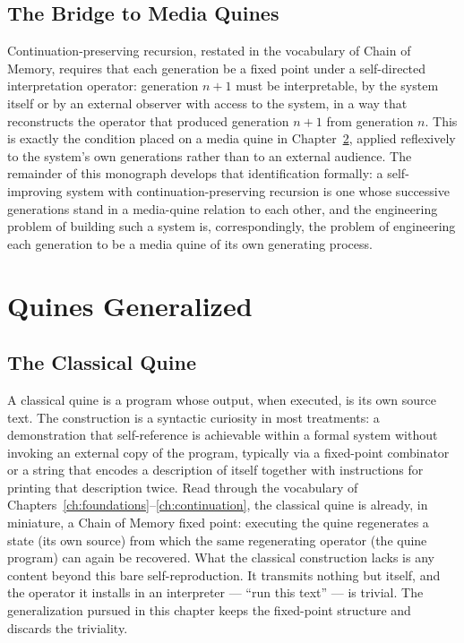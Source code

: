 \documentclass[11pt]{book}
\begin{document}
\section{The Bridge to Media Quines}

Continuation-preserving recursion, restated in the vocabulary of Chain of Memory, requires that each generation be a fixed point under a self-directed interpretation operator: generation $n+1$ must be interpretable, by the system itself or by an external observer with access to the system, in a way that reconstructs the operator that produced generation $n+1$ from generation $n$. This is exactly the condition placed on a media quine in Chapter~\ref{ch:quines}, applied reflexively to the system's own generations rather than to an external audience. The remainder of this monograph develops that identification formally: a self-improving system with continuation-preserving recursion is one whose successive generations stand in a media-quine relation to each other, and the engineering problem of building such a system is, correspondingly, the problem of engineering each generation to be a media quine of its own generating process.

\chapter{Quines Generalized}
\label{ch:quines}

\section{The Classical Quine}

A classical quine is a program whose output, when executed, is its own source text. The construction is a syntactic curiosity in most treatments: a demonstration that self-reference is achievable within a formal system without invoking an external copy of the program, typically via a fixed-point combinator or a string that encodes a description of itself together with instructions for printing that description twice. Read through the vocabulary of Chapters~\ref{ch:foundations}--\ref{ch:continuation}, the classical quine is already, in miniature, a Chain of Memory fixed point: executing the quine regenerates a state (its own source) from which the same regenerating operator (the quine program) can again be recovered. What the classical construction lacks is any content beyond this bare self-reproduction. It transmits nothing but itself, and the operator it installs in an interpreter --- ``run this text'' --- is trivial. The generalization pursued in this chapter keeps the fixed-point structure and discards the triviality.
\end{document}
